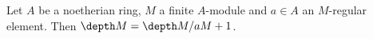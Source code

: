 
        

    \begin{corollary}\label{cor: induction on depth}
        Let $A$ be a noetherian ring, $M$ a finite $A$-module and $a \in A$ an $M$-regular element.
        Then $\depth M = \depth M/aM + 1$.
    \end{corollary}

